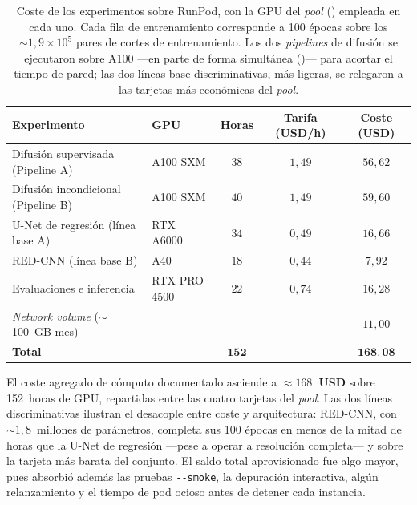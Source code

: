 \begin{table}[h!]
    \centering
    \small
    \begin{tabular}{llccc}
        \toprule
        Experimento & GPU & Horas & Tarifa (USD/h) & Coste (USD) \\
        \midrule
        Difusión supervisada (Pipeline A)   & A100 SXM     & $38$ & $1{,}49$ & $56{,}62$ \\
        Difusión incondicional (Pipeline B) & A100 SXM     & $40$ & $1{,}49$ & $59{,}60$ \\
        U-Net de regresión (línea base A)   & RTX A6000    & $34$ & $0{,}49$ & $16{,}66$ \\
        RED-CNN (línea base B)              & A40          & $18$ & $0{,}44$ & $7{,}92$ \\
        \midrule
        Evaluaciones e inferencia           & RTX PRO 4500 & $22$ & $0{,}74$ & $16{,}28$ \\
        \textit{Network volume} ($\sim$100~GB-mes) & --- & \multicolumn{2}{c}{---} & $11{,}00$ \\
        \midrule
        \textbf{Total} & & $\mathbf{152}$ & & $\mathbf{168{,}08}$ \\
        \bottomrule
    \end{tabular}
    \caption{Coste de los experimentos sobre RunPod, con la GPU del
    \textit{pool} () empleada en cada uno. Cada
    fila de entrenamiento corresponde a 100 épocas sobre los
    $\sim 1{,}9 \times 10^{5}$ pares de cortes de entrenamiento. Los
    dos \textit{pipelines} de difusión se ejecutaron sobre A100 —en
    parte de forma simultánea ()— para
    acortar el tiempo de pared; las dos líneas base discriminativas,
    más ligeras, se relegaron a las tarjetas más económicas del
    \textit{pool}.}
    \label{tab:pet-costes}
\end{table}

El coste agregado de cómputo documentado asciende a
\textbf{$\approx 168$~USD} sobre 152~horas de GPU, repartidas entre las
cuatro tarjetas del \textit{pool}. Las dos líneas discriminativas
ilustran el desacople entre coste y arquitectura: RED-CNN, con
$\sim 1{,}8$~millones de parámetros, completa sus 100 épocas en menos de
la mitad de horas que la U-Net de regresión ---pese a operar a
resolución completa--- y sobre la tarjeta más barata del conjunto. El
saldo total aprovisionado fue algo mayor, pues absorbió además las
pruebas \texttt{-{}-smoke}, la depuración interactiva, algún
relanzamiento y el tiempo de pod ocioso antes de detener cada instancia.
